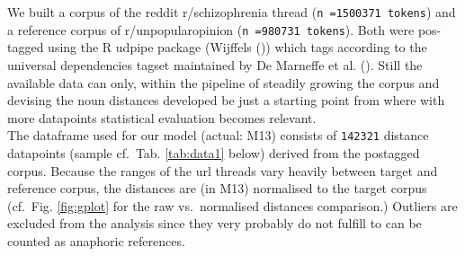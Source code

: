 \documentclass[
  12pt,
  oneside]{book}
\begin{document}
We built a corpus of the reddit r/schizophrenia thread (\texttt{n\ =1500371\ tokens}) and a reference corpus of r/unpopularopinion (\texttt{n\ =980731\ tokens}). Both were pos-tagged using the R udpipe package (Wijffels ()) which tags according to the universal dependencies tagset maintained by De Marneffe et al. (). Still the available data can only, within the pipeline of steadily growing the corpus and devising the noun distances developed be just a starting point from where with more datapoints statistical evaluation becomes relevant.\\
The dataframe used for our model (actual: M13) consists of \texttt{142321} distance datapoints (sample cf.~Tab. \ref{tab:data1} below) derived from the postagged corpus. Because the ranges of the url threads vary heavily between target and reference corpus, the distances are (in M13) normalised to the target corpus (cf.~Fig. \ref{fig:gplot} for the raw vs.~normalised distances comparison.) Outliers are excluded from the analysis since they very probably do not fulfill to can be counted as anaphoric references.
\end{document}
